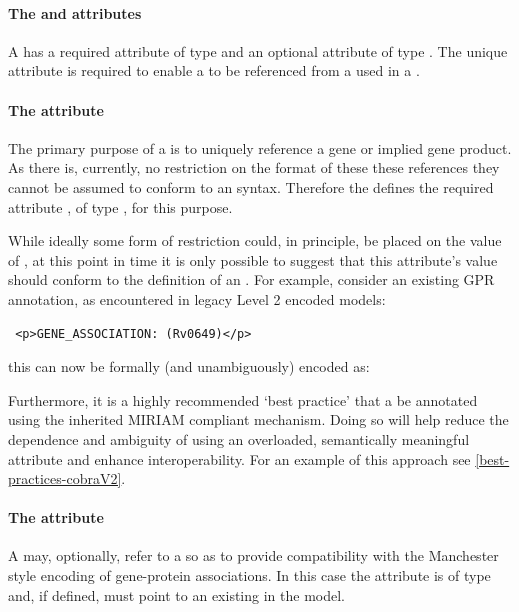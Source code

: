 \paragraph{The  and  attributes}
A \GeneProduct has a required attribute  of type 
and an optional attribute  of type . The
unique  attribute is required to enable a \GeneProduct to be
referenced from a \GeneProductRef used in a \GeneProductAssociation.

\paragraph{The  attribute}
The primary purpose of a \GeneProduct is to uniquely reference a gene or
implied gene product. As there is, currently, no restriction on the format of these these references they cannot be assumed to conform to an \SBML {} syntax. Therefore the \FBCPackage defines the required attribute , of type , for this purpose.

While ideally some form of restriction could, in principle, be placed on the value of , at this point in time it is only possible to suggest that this attribute's value should conform to the definition of an
. For example, consider an existing GPR annotation, as encountered in legacy \SBML Level 2 encoded models:
\begin{verbatim}
 <p>GENE_ASSOCIATION: (Rv0649)</p>
\end{verbatim}
%
this can now be formally (and unambiguously) encoded as:
%

Furthermore, it is a highly recommended `best practice' that a \GeneProduct be annotated using the inherited MIRIAM compliant \SBML \Annotation mechanism. Doing so will help reduce the dependence and ambiguity of using an overloaded, semantically meaningful  attribute and enhance interoperability. For an example of this approach see \ref{best-practices-cobraV2}.

\paragraph{The  attribute}
A \GeneProduct may, optionally, refer to a \Species so as to provide compatibility with the Manchester style encoding of gene-protein associations. In this case the attribute  is of type  and, if defined, must point to an existing \Species in the model.

